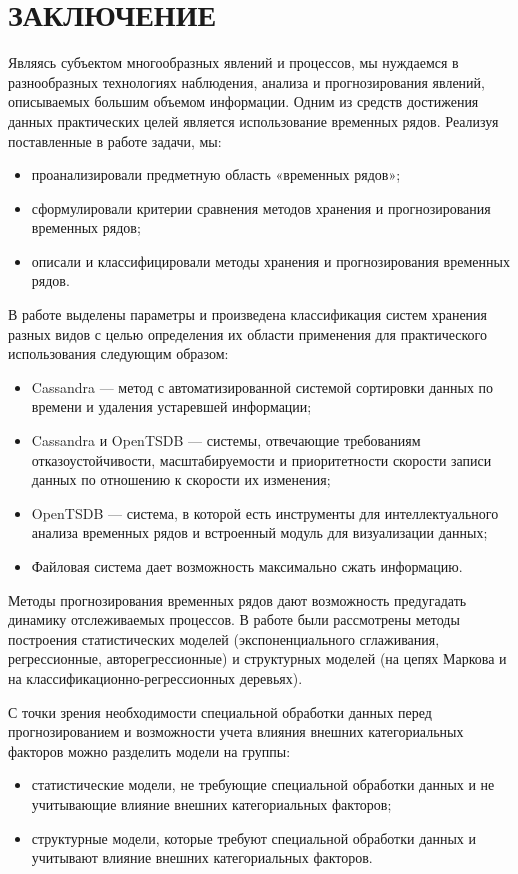 \chapter*{ЗАКЛЮЧЕНИЕ}

Являясь субъектом многообразных явлений и процессов, мы нуждаемся в разнообразных технологиях наблюдения,
анализа и прогнозирования явлений, описываемых большим объемом информации.
Одним из средств достижения данных практических целей является использование временных рядов.
Реализуя поставленные в работе задачи, мы:
\begin{itemize}
    \item проанализировали предметную область «временных рядов»;
    \item сформулировали критерии сравнения методов хранения и прогнозирования временных рядов;
    \item описали и классифицировали методы хранения и прогнозирования временных рядов.
\end{itemize}

В работе выделены параметры и произведена классификация систем хранения разных видов с целью определения их области применения для практического использования следующим образом:

\begin{itemize}
    \item Cassandra --- метод с автоматизированной системой сортировки данных по времени и удаления устаревшей информации;
    \item Cassandra и OpenTSDB --- системы, отвечающие требованиям отказоустойчивости, масштабируемости и приоритетности скорости записи данных по отношению к скорости их изменения;
    \item OpenTSDB --- система, в которой есть инструменты для интеллектуального анализа временных рядов и встроенный модуль для визуализации данных;
    \item Файловая система дает возможность максимально сжать информацию.
\end{itemize}

Методы прогнозирования временных рядов дают возможность предугадать динамику отслеживаемых процессов.
В работе были рассмотрены методы построения статистических моделей (экспоненциального сглаживания, регрессионные, авторегрессионные)
и структурных моделей (на цепях Маркова и на классификационно-регрессионных деревьях).

С точки зрения необходимости специальной обработки данных перед прогнозированием и возможности учета влияния внешних категориальных факторов можно разделить модели на группы:
\begin{itemize}
    \item статистические модели, не требующие специальной обработки данных и не учитывающие влияние внешних категориальных факторов;
    \item структурные модели, которые требуют специальной обработки данных и учитывают влияние внешних категориальных факторов.
\end{itemize}

